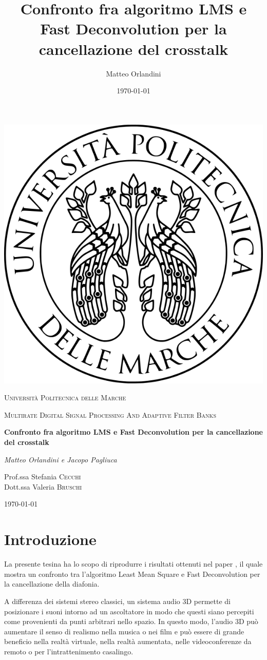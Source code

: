 \documentclass[12pt,a4paper,titlepage]{article}
\title{Confronto fra algoritmo LMS e Fast Deconvolution per la cancellazione del crosstalk}
\author{Matteo Orlandini}
\date{\today}
\begin{document}
\begin{titlepage}
	
	\centering
	\includegraphics[width=.2\textwidth]{Immagini/univpmlogo}\par\vspace{1cm}
	{\scshape\LARGE Università Politecnica delle Marche\par}
	\vspace{1cm}
	{\scshape\Large Multirate Digital Signal Processing And Adaptive Filter Banks \par}
	\vspace{1.5cm}
	{\huge\bfseries Confronto fra algoritmo LMS e Fast Deconvolution per la cancellazione del crosstalk \par}
	\vspace{2cm}
	{\Large\itshape Matteo Orlandini e Jacopo Pagliuca\par}
	\vfill
	Prof.ssa Stefania \textsc{Cecchi}\\
	Dott.ssa Valeria \textsc{Bruschi}
	
	\vfill
	
	{\large \today\par}
\end{titlepage}

\thispagestyle{empty}
\tableofcontents

\newpage
\setcounter{page}{1}
\section{Introduzione}
La presente tesina ha lo scopo di riprodurre i risultati ottenuti nel paper \cite{Li:comprehensive_comparison}, il quale mostra un confronto tra l'algoritmo Least Mean Square e Fast Deconvolution per la cancellazione della diafonia.

A differenza dei sistemi stereo classici, un sistema audio 3D permette di posizionare i suoni intorno ad un ascoltatore in modo che questi siano percepiti come provenienti da punti arbitrari nello spazio. In questo modo, l'audio 3D può  aumentare il senso di realismo nella musica o nei film e può essere di grande beneficio nella realtà virtuale, nella realtà aumentata, nelle videoconferenze da remoto o per l'intrattenimento casalingo.
\end{document}
